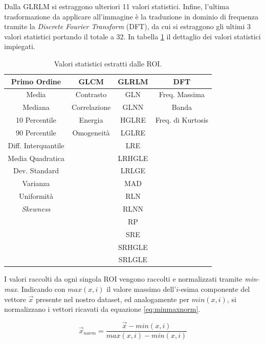 Dalla GLRLM si estraggono ulteriori 11 valori statistici.
Infine, l'ultima trasformazione da applicare all'immagine è la traduzione in
dominio di frequenza tramite la {\it Discrete Fourier Transform} (DFT), da cui
si estraggono gli ultimi 3 valori statistici portando il totale a 32.
In tabella \ref{table:features-toma} il dettaglio dei valori statistici impiegati.

\begin{table}
        \center
        \begin{tabular}[h]{||c|c|c|c||}
            \hline 
            \textbf{Primo Ordine} & \textbf{GLCM} & \textbf{GLRLM} & \textbf{DFT} \\
            \hline 
            \hline 
            Media & Contrasto & GLN & Freq. Massima \\
            Mediana & Correlazione & GLNN & Banda \\
            10 Percentile & Energia & HGLRE & Freq. di Kurtosis \\
            90 Percentile & Omogeneità & LGLRE & \\
            Diff. Interquantile & & LRE & \\
            Media Quadratica & & LRHGLE & \\
            Dev. Standard & & LRLGE & \\
            Varianza & & MAD & \\
            Uniformità & & RLN & \\
            {\it Skewness} & & RLNN & \\
            & & RP & \\
            & & SRE & \\
            & & SRHGLE & \\
            & & SRLGLE & \\
            \hline 
        \end{tabular}
        \caption{\label{table:features-toma}Valori statistici estratti dalle ROI.}
\end{table}

I valori raccolti da ogni singola ROI vengono raccolti e normalizzati tramite
{\it min-max}. 
Indicando con $max(x,i)$ il valore massimo dell'$i$-esima componente
del vettore $\vec{x}$ presente nel nostro dataset, ed analogamente
per $min(x,i)$, si normalizzano i vettori ricavati da equazione \ref{eq:minmaxnorm}.

\begin{equation}\label{eq:minmaxnorm}
    \vec{x}_{norm} = \frac{\vec{x} - min(x,i)}{max(x,i) - min(x,i)}
\end{equation}

